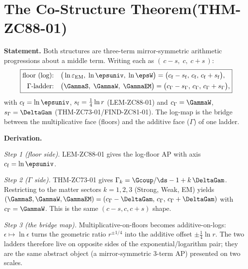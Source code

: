 \documentclass[12pt, a4paper]{article}
\renewcommand{\epsEM}{\varepsilon_{\rm EM}}     %
\begin{document}
\section{The Co-Structure Theorem\quad (THM-ZC88-01)}
\label{sec:thm-zc88}


\begin{formalbox}[title={THM-ZC88-01: Floor Lattice and $\Gamma$-Ladder
  are Co-Structural ($R_0$, Exact)}]

\textbf{Statement.}
Both structures are three-term mirror-symmetric arithmetic progressions
about a middle term. Writing each as
$(\,c-s,\;c,\;c+s\,)$:
\begin{equation}
  \boxed{
  \begin{aligned}
    \text{floor (log):}\quad
      &\big(\ln\epsEM,\;\ln\epsuniv,\;\ln\epsW\big)
       =\big(c_{\rm f}-s_{\rm f},\,c_{\rm f},\,c_{\rm f}+s_{\rm f}\big),\\
    \text{$\Gamma$-ladder:}\quad
      &\big(\GammaS,\;\GammaW,\;\GammaEM\big)
       =\big(c_\Gamma-s_\Gamma,\,c_\Gamma,\,c_\Gamma+s_\Gamma\big),
  \end{aligned}}
  \label{eq:thm-main-zc88}
\end{equation}
with $c_{\rm f}=\ln\epsuniv$, $s_{\rm f}=\tfrac14\ln r$ (LEM-ZC88-01) and
$c_\Gamma=\GammaW$, $s_\Gamma=\DeltaGam$ (THM-ZC73-01/FIND-ZC81-01). The
log-map is the bridge between the multiplicative face (floors) and the
additive face ($\Gamma$) of one ladder.

\textbf{Derivation.}

\textit{Step 1 (floor side).}
LEM-ZC88-01 gives the log-floor AP with axis $c_{\rm f}=\ln\epsuniv$.

\textit{Step 2 ($\Gamma$ side).}
THM-ZC73-01 gives $\Gamma_k=\Gcoup/\ds-1+k\,\DeltaGam$. Restricting to the
matter sectors $k=1,2,3$ (Strong, Weak, EM) yields
$(\GammaS,\GammaW,\GammaEM)=(c_\Gamma-\DeltaGam,\,c_\Gamma,\,c_\Gamma+\DeltaGam)$
with $c_\Gamma=\GammaW$. This is the same $(c-s,c,c+s)$ shape.

\textit{Step 3 (the bridge map).}
Multiplicative-on-floors becomes additive-on-logs:
$\epsilon\mapsto\ln\epsilon$ turns the geometric ratio $r^{\pm1/4}$ into the
additive offset $\pm\tfrac14\ln r$. The two ladders therefore live on
opposite sides of the exponential/logarithm pair; they are the same abstract
object (a mirror-symmetric 3-term AP) presented on two scales.


\end{formalbox}
\end{document}
